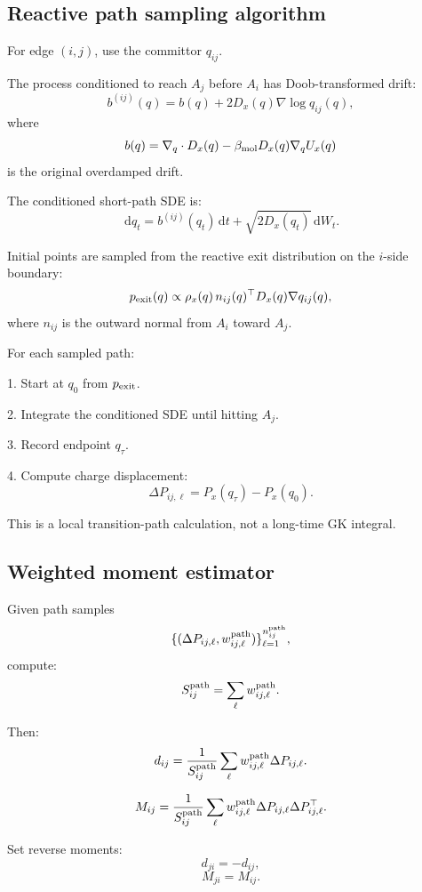 \documentclass[11pt]{article}
\newcommand{\dd}{\,\mathrm d}
\begin{document}
  \subsection{Reactive path sampling algorithm}

  For edge \((i,j)\), use the committor \(q_{ij}\).

  The process conditioned to reach \(A_j\) before \(A_i\) has Doob-transformed
  drift:
  \[
  b^{(ij)}(q)
  =
  b(q)+2D_x(q)\nabla\log q_{ij}(q),
  \]
  where
  \[
  b(q)=\nabla_q\cdot D_x(q)-\beta_{\rm mol}D_x(q)\nabla_q U_x(q)
  \]
  is the original overdamped drift.

  The conditioned short-path SDE is:
  \[
  \dd q_t
  =
  b^{(ij)}(q_t)\dd t
  +
  \sqrt{2D_x(q_t)}\dd W_t.
  \]

  Initial points are sampled from the reactive exit distribution on the
  \(i\)-side boundary:
  \[
  p_{\rm exit}(q)
  \propto
  \rho_x(q)
  \,n_{ij}(q)^\top D_x(q)\nabla q_{ij}(q),
  \]
  where \(n_{ij}\) is the outward normal from \(A_i\) toward \(A_j\).

  For each sampled path:

  1. Start at \(q_0\) from \(p_{\rm exit}\).

  2. Integrate the conditioned SDE until hitting \(A_j\).

  3. Record endpoint \(q_\tau\).

  4. Compute charge displacement:
  \[
  \Delta P_{ij,\ell}=P_x(q_\tau)-P_x(q_0).
  \]

  This is a local transition-path calculation, not a long-time GK integral.

  \subsection{Weighted moment estimator}

  Given path samples
  \[
  \{(\Delta P_{ij,\ell},w_{ij,\ell}^{\rm path})\}_{\ell=1}^{n_{ij}^{\rm path}},
  \]
  compute:
  \[
  S_{ij}^{\rm path}=\sum_\ell w_{ij,\ell}^{\rm path}.
  \]

  Then:
  \[
  d_{ij}
  =
  \frac{1}{S_{ij}^{\rm path}}
  \sum_\ell
  w_{ij,\ell}^{\rm path}\Delta P_{ij,\ell}.
  \]

  \[
  M_{ij}
  =
  \frac{1}{S_{ij}^{\rm path}}
  \sum_\ell
  w_{ij,\ell}^{\rm path}
  \Delta P_{ij,\ell}\Delta P_{ij,\ell}^{\top}.
  \]

  Set reverse moments:
  \[
  d_{ji}=-d_{ij},
  \]
  \[
  M_{ji}=M_{ij}.
  \]
\end{document}
